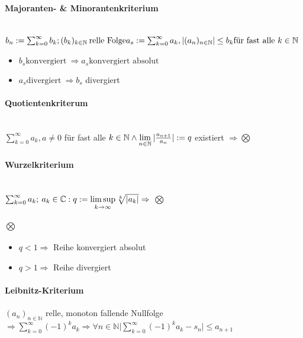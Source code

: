 \documentclass[paper=a3,paper=landscape, fontsize=9pt,DIV=30]{scrartcl}
\newcommand{\compl}{\mathbb{C}}
\newcommand{\nat}{\mathbb{N}}
\newcommand{\aseq}{(a_n)_{n \in \nat}}
\begin{document}
\begin{multicols*}{4}
  \paragraph{Majoranten- \& Minorantenkriterium}\hspace{0pt} \\
  $ b_n := \sum_{k=0}^{\infty} b_k; (b_k)_{k \in \nat}\:\text{relle Folge}\\ a_s := \sum_{k=0}^{\infty} a_k, |\aseq| \leq b_k \text{für fast alle}\ k \in \nat$
  \begin{itemize}
  \item $b_s \text{konvergiert}\ \Rightarrow a_s \text{konvergiert absolut}$
  \item $a_s \text{divergiert}\ \Rightarrow b_s$ divergiert
  \end{itemize}


  \paragraph{Quotientenkriterum}\hspace{0pt} \\
  $ \sum_{k=0}^{\infty} a_k, a \neq 0$ für fast alle $k \in \nat \wedge \lim\limits_{n \in \nat} \arrowvert \frac{a_{n+1}}{a_n} \arrowvert := q$ existiert $\Rightarrow \bigotimes$


  \paragraph{Wurzelkriterium}\hspace{0pt} \\
  $ \sum_{k=0}^{\infty} a_k;\:a_k \in \compl: q := \limsup\limits_{k \rightarrow \infty} \sqrt[k]{\arrowvert a_k \arrowvert} \Rightarrow$ $\bigotimes$


  \paragraph{$\bigotimes$}
  \begin{itemize}
  \item $q < 1 \Rightarrow$ Reihe konvergiert absolut
  \item $q > 1 \Rightarrow$ Reihe divergiert
  \end{itemize}


  \paragraph{Leibnitz-Kriterium}
  $\aseq$ relle, monoton fallende Nullfolge $ \Rightarrow \sum_{k=0}^{\infty} (-1)^ka_k \Rightarrow \forall n \in \nat \lvert \sum_{k=0}^{\infty}(-1)^ka_k-s_n \rvert \leq  a_{n+1}$



\end{multicols*}
\end{document}
